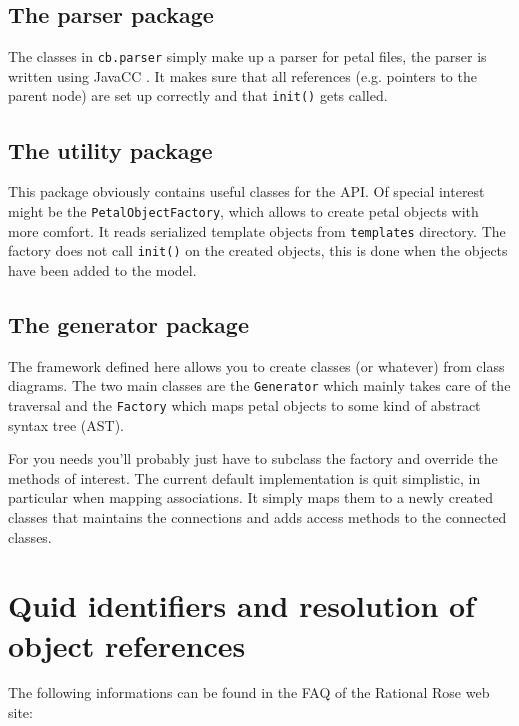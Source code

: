 \documentclass{article}
\begin{document}
\subsection{The parser package}

The classes in \texttt{cb.parser} simply make up a parser for petal
files, the parser is written using JavaCC \cite{javacc}. It makes sure
that all references (e.g. pointers to the parent node) are set up
correctly and that \texttt{init()} gets called.

\subsection{The utility package}

This package obviously contains useful classes for the API. Of special
interest might be the \texttt{PetalObjectFactory}, which allows to
create petal objects with more comfort. It reads serialized template
objects from \texttt{templates} directory. The factory does not call
\texttt{init()} on the created objects, this is done when the objects
have been added to the model.

\subsection{The generator package}

The framework defined here allows you to create classes (or whatever)
from class diagrams. The two main classes are the \texttt{Generator}
which mainly takes care of the traversal and the \texttt{Factory}
which maps petal objects to some kind of abstract syntax tree (AST).

For you needs you'll probably just have to subclass the factory and
override the methods of interest. The current default implementation
is quit simplistic, in particular when mapping associations. It simply
maps them to a newly created classes that maintains the connections
and adds access methods to the connected classes.

 


\appendix

\section{Quid identifiers and resolution of object references}

The following informations can be found in the FAQ of the Rational
Rose web site:
\end{document}
